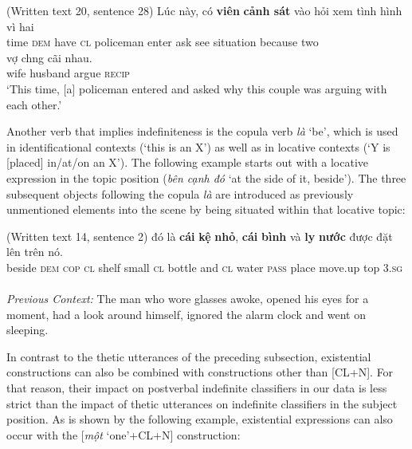 \documentclass[output=paper]{langsci/langscibook}
\begin{document}
\begin{exe}
\ex\label{1ex:30}
(Written text 20, sentence 28)
\exi{}
\gll Lúc  này,     có    {\textbf{viên}} {\textbf{cảnh sát}}     vào    hỏi   xem  {tình hình}  vì             hai \\
time {\textsc{dem}}  have {\textsc{cl}}   policeman  enter  ask   see   situation  because   two \\
\glt
\exi{}
\gll vợ      ch{\daob}ng      cãi     nhau. \\
wife   husband  argue {\textsc{recip}} \\
\glt `This time, [a] policeman entered and asked why this couple was arguing with each other.'
\end{exe}

Another verb that implies indefiniteness is the copula verb {\emph{là}} `be', which is used in identificational contexts (`this is an X') as well as in locative contexts (`Y is [placed] in/at/on an X').  The following example starts out with a locative expression in the topic position ({\emph{bên cạnh đó}} `at the side of it, beside'). The three subsequent objects following the copula {\emph{là}} are introduced as previously unmentioned elements into the scene by being situated within that locative topic:


\begin{exe}
\ex\label{1ex:31}
(Written text 14, sentence 2)
\exi{}
  đó       là      {\textbf{cái}}  {\textbf{kệ}}      {\textbf{nhỏ}},    {\textbf{cái}}  {\textbf{bình}}     và    {\textbf{ly}}   {\textbf{nước}} được    đặt     lên           trên  nó.\\
beside      {\textsc{dem}}  {\textsc{cop}}  {\textsc{cl}}  shelf  small  {\textsc{cl}}  bottle   and  {\textsc{cl}} water {\textsc{pass}}  place  move.up  top    3.{\textsc{sg}}\\
 \\[1mm]
{\emph{Previous Context:}} The man who wore glasses awoke, opened his eyes for a moment, had a look around himself, ignored the alarm clock and went on sleeping.
\end{exe}

In contrast to the thetic utterances of the preceding subsection, existential constructions can also be combined with constructions other than [CL+N]. For that reason, their impact on postverbal indefinite classifiers in our data is less strict than the impact of thetic utterances on indefinite classifiers in the subject position. As is shown by the following example, existential expressions can also occur with the [{\emph{một}} `one'+CL+N] construction:
\end{document}
